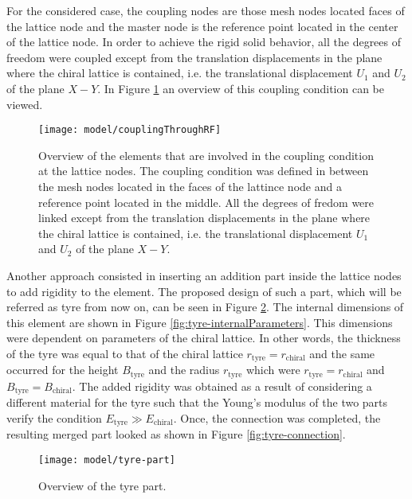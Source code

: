     For the considered case, the coupling nodes are those mesh nodes located faces of the lattice node and the master node is the reference point located in the center of the lattice node. In order to achieve the rigid solid behavior, all the degrees of freedom were coupled except from the translation displacements in the plane where the chiral lattice is contained, i.e. the translational displacement $U_1$ and $U_2$ of the plane $X-Y$. In Figure \ref{fig:couplingThroughRF} an overview of this coupling condition can be viewed.

    \begin{figure}[!htpb]
      \centering
      \texttt{[image: model/couplingThroughRF]}
      \caption[Overview of the elements that are involved in the coupling condition at the lattice nodes]{Overview of the elements that are involved in the coupling condition at the lattice nodes. The coupling condition was defined in between the mesh nodes located in the faces of the lattince node and a reference point located in the middle. All the degrees of fredom were linked except from the translation displacements in the plane where the chiral lattice is contained, i.e. the translational displacement $U_1$ and $U_2$ of the plane $X-Y$.}\label{fig:couplingThroughRF}
    \end{figure}

    Another approach consisted in inserting an addition part inside the lattice nodes to add rigidity to the element. The proposed design of such a part, which will be referred as tyre from now on, can be seen in Figure \ref{fig:tyre-part}. The internal dimensions of this element are shown in Figure \ref{fig:tyre-internalParameters}. This dimensions were dependent on parameters of the chiral lattice. In other words, the thickness of the tyre was equal to that of the chiral lattice $r_{\mathrm{tyre}} = r_{\mathrm{chiral}}$ and the same occurred for the height $B_{\mathrm{tyre}}$ and the radius $r_{\mathrm{tyre}}$ which were $r_{\mathrm{tyre}} = r_{\mathrm{chiral}}$ and $B_{\mathrm{tyre}} = B_{\mathrm{chiral}}$. The added rigidity was obtained as a result of considering a different material for the tyre such that the Young's modulus of the two parts verify the condition $E_{\mathrm{tyre}} \gg E_{\mathrm{chiral}}$. Once, the connection was completed, the resulting merged part looked as shown in Figure \ref{fig:tyre-connection}.

    \begin{figure}[!htpb]
      \centering
      \texttt{[image: model/tyre-part]}
      \caption[Overview of the tyre part]{Overview of the tyre part.}\label{fig:tyre-part}
    \end{figure}

